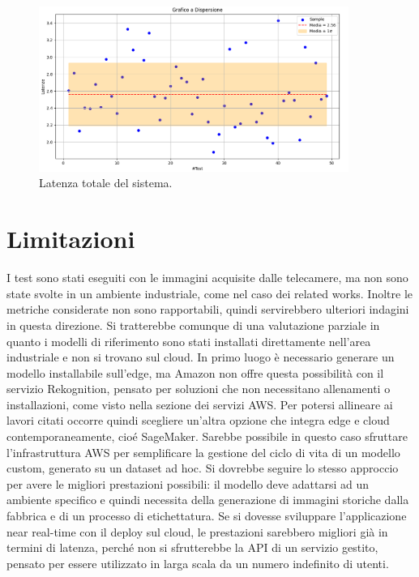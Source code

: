 \begin{figure}[htbp]
    \centering
    \includegraphics[width=0.9\textwidth]{figures/system-latency.png}
    \caption{Latenza totale del sistema.} 
    \label{fig:system-latency}
\end{figure}

\section{Limitazioni}











I test sono stati eseguiti con le immagini acquisite dalle telecamere, ma non sono state svolte in un ambiente industriale, come nel caso dei related works. Inoltre le metriche considerate non sono rapportabili, quindi servirebbero ulteriori indagini in questa direzione. Si tratterebbe comunque di una valutazione parziale in quanto i modelli di riferimento sono stati installati direttamente nell'area industriale e non si trovano sul cloud. In primo luogo è necessario generare un modello installabile sull'edge, ma Amazon non offre questa possibilità con il servizio Rekognition, pensato per soluzioni che non necessitano allenamenti o installazioni, come visto nella sezione dei servizi AWS. Per potersi allineare ai lavori citati occorre quindi scegliere un'altra opzione che integra edge e cloud contemporaneamente, cioé SageMaker. Sarebbe possibile in questo caso sfruttare l'infrastruttura AWS per semplificare la gestione del ciclo di vita di un modello custom, generato su un dataset ad hoc. Si dovrebbe seguire lo stesso approccio per avere le migliori prestazioni possibili: il modello deve adattarsi ad un ambiente specifico e quindi necessita della generazione di immagini storiche dalla fabbrica e di un processo di etichettatura. Se si dovesse sviluppare l'applicazione near real-time con il deploy sul cloud, le prestazioni sarebbero migliori già in termini di latenza, perché non si sfrutterebbe la API di un servizio gestito, pensato per essere utilizzato in larga scala da un numero indefinito di utenti.     

